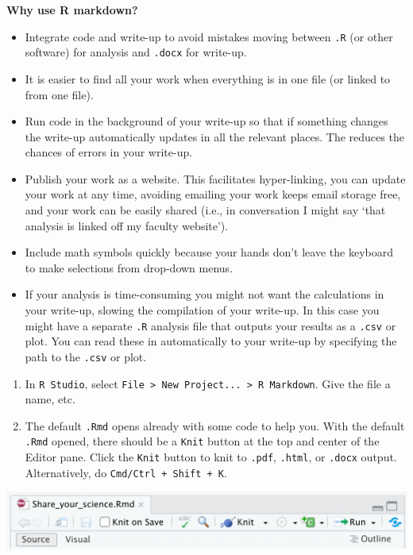 \documentclass[
]{book}
\begin{document}
\textbf{Why use R markdown?}

\begin{itemize}
\item
  Integrate code and write-up to avoid mistakes moving between \texttt{.R} (or other software) for analysis and \texttt{.docx} for write-up.
\item
  It is easier to find all your work when everything is in one file (or linked to from one file).
\item
  Run code in the background of your write-up so that if something changes the write-up automatically updates in all the relevant places. The reduces the chances of errors in your write-up.
\item
  Publish your work as a website. This facilitates hyper-linking, you can update your work at any time, avoiding emailing your work keeps email storage free, and your work can be easily shared (i.e., in conversation I might say `that analysis is linked off my faculty website').
\item
  Include math symbols quickly because your hands don't leave the keyboard to make selections from drop-down menus.
\item
  If your analysis is time-consuming you might not want the calculations in your write-up, slowing the compilation of your write-up. In this case you might have a separate \texttt{.R} analysis file that outputs your results as a \texttt{.csv} or plot. You can read these in automatically to your write-up by specifying the path to the \texttt{.csv} or plot.
\end{itemize}

\begin{enumerate}
\def\labelenumi{\arabic{enumi}.}
\item
  In \texttt{R\ Studio}, select \texttt{File\ \textgreater{}\ New\ Project...\ \textgreater{}\ R\ Markdown}. Give the file a name, etc.
\item
  The default \texttt{.Rmd} opens already with some code to help you. With the default \texttt{.Rmd} opened, there should be a \texttt{Knit} button at the top and center of the Editor pane. Click the \texttt{Knit} button to knit to \texttt{.pdf}, \texttt{.html}, or \texttt{.docx} output. Alternatively, do \texttt{Cmd/Ctrl\ +\ Shift\ +\ K}.
\end{enumerate}

\begin{center}\includegraphics[width=0.5\linewidth]{figures/Knit} \end{center}
\end{document}
